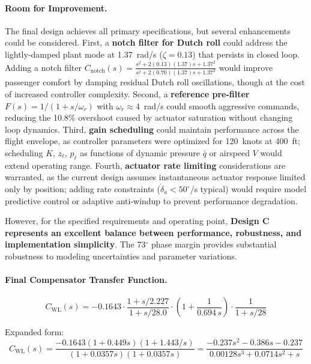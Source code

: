 \paragraph{Room for Improvement.}

The final design achieves all primary specifications, but several enhancements could be considered. First, a \textbf{notch filter for Dutch roll} could address the lightly-damped plant mode at 1.37~rad/s ($\zeta=0.13$) that persists in closed loop. Adding a notch filter $C_{\text{notch}}(s) = \frac{s^2 + 2(0.13)(1.37)s + 1.37^2}{s^2 + 2(0.70)(1.37)s + 1.37^2}$ would improve passenger comfort by damping residual Dutch roll oscillations, though at the cost of increased controller complexity. Second, a \textbf{reference pre-filter} $F(s) = 1/(1+s/\omega_r)$ with $\omega_r \approx 4$~rad/s could smooth aggressive commands, reducing the 10.8\% overshoot caused by actuator saturation without changing loop dynamics. Third, \textbf{gain scheduling} could maintain performance across the flight envelope, as controller parameters were optimized for 120~knots at 400~ft; scheduling $K$, $z_\ell$, $p_\ell$ as functions of dynamic pressure $\bar{q}$ or airspeed $V$ would extend operating range. Fourth, \textbf{actuator rate limiting} considerations are warranted, as the current design assumes instantaneous actuator response limited only by position; adding rate constraints ($\dot{\delta}_a < 50^\circ$/s typical) would require model predictive control or adaptive anti-windup to prevent performance degradation.

However, for the specified requirements and operating point, \textbf{Design C represents an excellent balance between performance, robustness, and implementation simplicity}. The 73$^\circ$ phase margin provides substantial robustness to modeling uncertainties and parameter variations.

\paragraph{Final Compensator Transfer Function.}

\begin{equation}
\boxed{~
C_{\mathrm{WL}}(s) = -0.1643 \cdot
\frac{1 + s/2.227}{1 + s/28.0} \cdot
\left(1 + \frac{1}{0.694\,s}\right) \cdot
\frac{1}{1 + s/28}
~}
\label{eq:final_controller}
\end{equation}

Expanded form:
\begin{equation}
C_{\mathrm{WL}}(s) = \frac{-0.1643(1 + 0.449s)(1 + 1.443/s)}{(1 + 0.0357s)(1 + 0.0357s)}
= \frac{-0.237s^2 - 0.386s - 0.237}{0.00128s^3 + 0.0714s^2 + s}
\end{equation}

